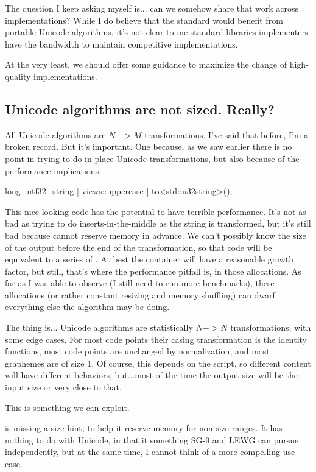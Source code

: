 \documentclass{wg21}
\begin{document}
The question I keep asking myself is... can we somehow share that work across implementations?
While I do believe that the standard would benefit from portable Unicode algorithms, it's not clear to me standard libraries implementers have the bandwidth to maintain competitive implementations.

At the very least, we should offer some guidance to maximize the change of high-quality implementations.

\subsection{Unicode algorithms are not sized. Really?}

All Unicode algorithms are $N->M$ transformations. I've said that before, I'm a broken record. But it's important.
One because, as we saw earlier there is no point in trying to do in-place Unicode transformations, but also because of the performance implications.

\begin{colorblock}
long_utf32_string | views::uppercase | to<std::u32string>();
\end{colorblock}

This nice-looking code has the potential to have terrible performance.
It's not as bad as trying to do inserts-in-the-middle as the string is transformed, but it's still bad
because  cannot reserve memory in advance.
We can't possibly know the size of the output before the end of the transformation, so that code will be equivalent to a series of .
At best the container will have a reasonable growth factor, but still, that's where the performance pitfall is, in those allocations.
As far as I was able to observe (I still need to run more benchmarks), these allocations (or rather constant resizing and memory shuffling) can dwarf everything else
the algorithm may be doing.

The thing is... Unicode algorithms are statistically $N->N$ transformations, with some edge cases.
For most code points their casing transformation is the identity functions, most code points are unchanged by normalization, and most graphemes are of size 1.
Of course, this depends on the script, so different content will have different behaviors, but...most of the time the output size will be the input size or very close to that.

This is something we can exploit.

 is missing a size hint, to help it reserve memory for non-size ranges. It has nothing to do with Unicode, in that it something
SG-9 and LEWG can pursue independently, but at the same time, I cannot think of a more compelling use case.
\end{document}
